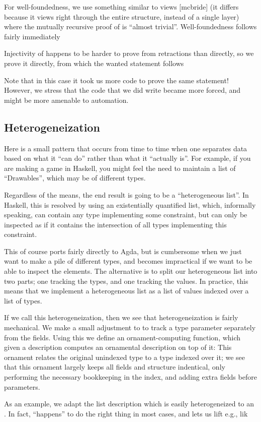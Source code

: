 For well-foundedness, we use something similar to views [mcbride] (it differs because it views right through the entire structure, instead of a single layer)
where the mutually recursive proof of  is ``almost trivial''. Well-foundedness follows fairly immediately

Injectivity of  happens to be harder to prove from retractions than directly, so we prove it directly, from which the wanted statement follows

Note that in this case it took us more code to prove the same statement! However, we stress that the code that we did write became more forced, and might be more amenable to automation.


\subsection{Heterogeneization}
Here is a small pattern that occurs from time to time when one separates data based on what it ``can do'' rather than what it ``actually is''. For example, if you are making a game in Haskell, you might feel the need to maintain a list of ``Drawables'', which may be of different types.

Regardless of the means, the end result is going to be a ``heterogeneous list''. In Haskell, this is resolved by using an existentially quantified list, which, informally speaking, can contain any type implementing some constraint, but can only be inspected as if it contains the intersection of all types implementing this constraint. 

This of course ports fairly directly to Agda, but is cumbersome when we just want to make a pile of different types, and becomes impractical if we want to be able to inspect the elements. The alternative is to split our heterogeneous list into two parts; one tracking the types, and one tracking the values. In practice, this means that we implement a heterogeneous list as a list of values indexed over a list of types.

If we call this heterogeneization, then we see that heterogeneization is fairly mechanical. We make a small adjustment to  to track a type parameter separately from the fields. Using this we define an ornament-computing function, which given a description computes an ornamental description on top of it:
This ornament relates the original unindexed type to a type indexed over it; we see that this ornament largely keeps all fields and structure indentical, only performing the necessary bookkeeping in the index, and adding extra fields before parameters.

As an example, we adapt the list description
which is easily heterogeneized to an . In fact,  ``happens'' to do the right thing in most cases, and lets us lift e.g.,  lik
